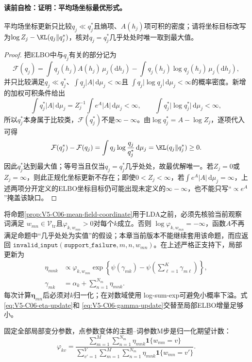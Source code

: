 \paragraph{读前自检：证明：平均场坐标最优形式。}平均场坐标更新只比较$q_j\ll q_j^*$且熵项、$A(h_j)$项可积的密度；请将坐标目标改写为$\log Z_j-\KL(q_j\|q_j^*)$，核对$q_j=q_j^*$几乎处处时唯一取到最大值。\par

\begin{proof}
把ELBO中与$q_j$有关的部分记为
\[
\mathcal F(q_j)=\int q_j(h_j)A(h_j)\,\mu_j(\mathrm dh_j)
-\int q_j(h_j)\log q_j(h_j)\,\mu_j(\mathrm dh_j),
\]
并只比较满足$q_j\ll q_j^*$、$\int q_j\lvert A\rvert\,\mathrm d\mu_j<\infty$且
$\int q_j\lvert\log q_j\rvert\,\mathrm d\mu_j<\infty$的概率密度。新增的加权可积条件给出
\[
\int q_j^*\lvert A\rvert\,\mathrm d\mu_j
=Z_j^{-1}\int e^A\lvert A\rvert\,\mathrm d\mu_j<\infty,
\qquad
\int q_j^*\lvert\log q_j^*\rvert\,\mathrm d\mu_j<\infty,
\]
所以$q_j^*$本身属于比较类，$\mathcal F(q_j^*)$不是$\infty-\infty$。由$\log q_j^*=A-\log Z_j$，逐项代入可得
\[
\mathcal F(q_j^*)-\mathcal F(q_j)
=\int q_j\log\frac{q_j}{q_j^*}\,\mathrm d\mu_j
=\KL(q_j\|q_j^*)\ge0.
\]
因此$q_j^*$达到最大值；等号当且仅当$q_j=q_j^*$几乎处处，故最优解唯一。若$Z_j=0$或$Z_j=\infty$，则此正规化坐标更新不存在；即使$0<Z_j<\infty$，若$\int e^A\lvert A\rvert\,\mathrm d\mu_j=\infty$，上述两项分开定义的ELBO坐标目标仍可能出现未定义的$\infty-\infty$，也不能只写“$\propto e^A$”掩盖该缺口。
\end{proof}

将命题\ref{prop:V5-C06-mean-field-coordinate}用于LDA之前，必须先核验当前观察词满足
$w_{mn}\in\mathcal V_{\mathrm{tr}}$且$\varphi_{k,w_{mn}}>0$对每个$k$成立。否则
$\log\varphi_{k,w_{mn}}=-\infty$，函数$A$不再满足命题中“几乎处处为实值”的假设；本章当前版本不能继续套用该命题，而应返回
$\mathtt{invalid\_input}(\mathtt{support\_failure},m,n,w_{mn})$。在上述严格正支持下，局部更新为
\begin{align}
\eta_{mnk}
&\propto \varphi_{k,w_{mn}}
\exp\!\left\{\psi(\gamma_{mk})-
\psi\!\left(\sum_{\ell=1}^{K}\gamma_{m\ell}\right)\right\},
\label{eq:V5-C06-eta-update}\\
\gamma_{mk}
&=\alpha_k+\sum_{n=1}^{N_m}\eta_{mnk}.
\label{eq:V5-C06-gamma-update}
\end{align}
每次计算$\boldsymbol\eta_{mn}$后必须对$k$归一化；在对数域使用
log-sum-exp可避免小概率下溢。式\eqref{eq:V5-C06-eta-update}和
\eqref{eq:V5-C06-gamma-update}交替至局部ELBO增量足够小。

固定全部局部变分参数，点参数变体的主题--词参数M步是归一化期望计数：
\begin{equation}
\varphi_{kv}
=\frac{\displaystyle\sum_{m=1}^{M}\sum_{n=1}^{N_m}
\eta_{mnk}\mathbf1\{w_{mn}=v\}}
{\displaystyle\sum_{v'=1}^{V}\sum_{m=1}^{M}\sum_{n=1}^{N_m}
\eta_{mnk}\mathbf1\{w_{mn}=v'\}}.
\label{eq:V5-C06-phi-update}
\end{equation}

